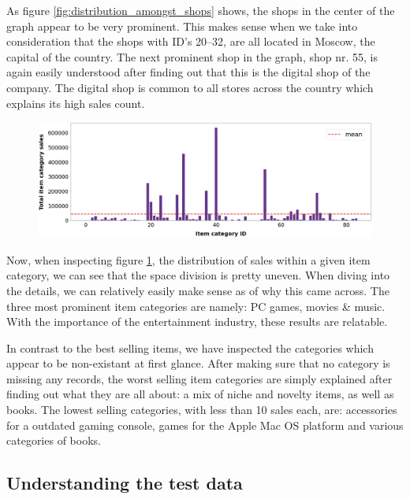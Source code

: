 As figure \ref{fig:distribution_amongst_shops} shows, the shops in the center of the graph appear to be very prominent. This makes sense when we take into consideration that the shops with ID's 20--32, are all located in Moscow, the capital of the country.
The next prominent shop in the graph, shop nr. 55, is again easily understood after finding out that this is the digital shop of the company. The digital shop is common to all stores across the country which explains its high sales count.

\begin{figure}[h]
  \centering
  \includegraphics[width=0.9\linewidth]{external_content/graphs/distribution_across_item_categories.png}
  \captionsetup{justification=centering}
  \label{fig:distribution_amongst_item_categories}
\end{figure}

Now, when inspecting figure \ref{fig:distribution_amongst_item_categories}, the distribution of sales within a given item category, we can see that the space division is pretty uneven. When diving into the details, we can relatively easily make sense as of why this came across.
The three most prominent item categories are namely: PC games, movies \& music. With the importance of the entertainment industry, these results are relatable.

In contrast to the best selling items, we have inspected the categories which appear to be non-existant at first glance. After making sure that no category is missing any records, the worst selling item categories are simply explained after finding out what they are all about: a mix of niche and novelty items, as well as books. The lowest selling categories, with less than 10 sales each, are: accessories for a outdated gaming console, games for the Apple Mac OS platform and various categories of books.

\subsection{Understanding the test data} \label{sec:testdata}

